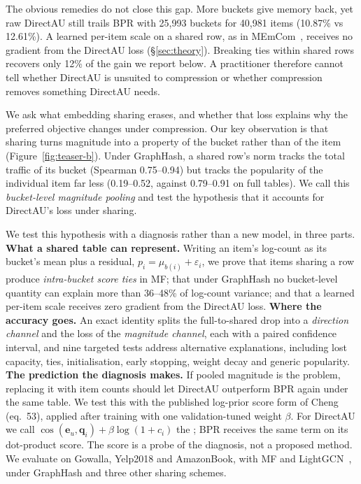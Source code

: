 The obvious remedies do not close this gap. More buckets give memory back, yet raw DirectAU still trails BPR with 25{,}993 buckets for 40{,}981 items (10.87\% vs 12.61\%). A learned per-item scale on a shared row, as in MEmCom~\cite{pansare2022memcom}, receives no gradient from the DirectAU loss (\S\ref{sec:theory}). Breaking ties within shared rows recovers only 12\% of the gain we report below. A practitioner therefore cannot tell whether DirectAU is unsuited to compression or whether compression removes something DirectAU needs.

We ask what embedding sharing erases, and whether that loss explains why the preferred objective changes under compression. Our key observation is that sharing turns magnitude into a property of the bucket rather than of the item (Figure~\ref{fig:teaser-b}). Under GraphHash, a shared row's norm tracks the total traffic of its bucket (Spearman 0.75--0.94) but tracks the popularity of the individual item far less (0.19--0.52, against 0.79--0.91 on full tables). We call this \emph{bucket-level magnitude pooling} and test the hypothesis that it accounts for DirectAU's loss under sharing.

We test this hypothesis with a diagnosis rather than a new model, in three parts.
\textbf{What a shared table can represent.} Writing an item's log-count as its bucket's mean plus a residual, $p_i=\mu_{b(i)}+\varepsilon_i$, we prove that items sharing a row produce \emph{intra-bucket score ties} in MF; that under GraphHash no bucket-level quantity can explain more than 36--48\% of log-count variance; and that a learned per-item scale receives zero gradient from the DirectAU loss.
\textbf{Where the accuracy goes.} An exact identity splits the full-to-shared drop into a \emph{direction channel} and the loss of the \emph{magnitude channel}, each with a paired confidence interval, and nine targeted tests address alternative explanations, including lost capacity, ties, initialisation, early stopping, weight decay and generic popularity.
\textbf{The prediction the diagnosis makes.} If pooled magnitude is the problem, replacing it with item counts should let DirectAU outperform BPR again under the same table. We test this with the published log-prior score form of Cheng~\cite{cheng2026rankone} (eq.~53), applied after training with one validation-tuned weight $\beta$. For DirectAU we call $\cos(\mathbf{e}_u,\mathbf{q}_i)+\beta\log(1+c_i)$ the \emph{\crs{}}; BPR receives the same term on its dot-product score. The score is a probe of the diagnosis, not a proposed method.
We evaluate on Gowalla, Yelp2018 and AmazonBook, with MF and LightGCN~\cite{he2020lightgcn}, under GraphHash and three other sharing schemes.

